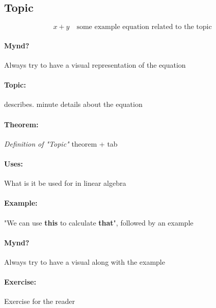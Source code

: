 \documentclass{article}
\begin{document}
\color{white}
\subsection{Topic}
\color{black}

\begin{equation}
x + y \quad \textrm{some example equation related to the topic} 
\end{equation}

\paragraph{Mynd?} Always try to have a visual representation of the equation

\paragraph{Topic:} describes. minute details about the equation

\color{theorem} \paragraph{Theorem:} \textit{Definition of "Topic"} \color{black}  theorem + tab

\paragraph{Uses:} What is it be used for in linear algebra

\paragraph{Example:} "We can use \textbf{this} to calculate \textbf{that}", followed by an example

\paragraph{Mynd?} Always try to have a visual along with the example

\paragraph{Exercise:} Exercise for the reader
\end{document}
